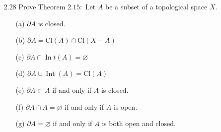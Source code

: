 \documentclass[12pt]{article}
\begin{document}
\begin{enumerate}
	\item[2.28] Prove Theorem $2.15 :$ Let $A$ be a subset of a topological space $X .$
		\begin{enumerate}
			\item[(a)] $\partial A$ is closed.
			\item[(b)] $\partial A = \mathrm { Cl } ( A ) \cap \mathrm { Cl } ( X - A )$
			\item[(c)] $\partial A \cap \operatorname { In } t ( A ) = \varnothing$
			\item[(d)] $\partial A \cup \operatorname { Int } ( A ) = \mathrm { Cl } ( A )$
			\item[(e)] $\partial A \subset A$ if and only if $A$ is closed.
			\item[(f)] $\partial A \cap A = \varnothing$ if and only if $A$ is open.
			\item[(g)] $\partial A = \varnothing$ if and only if $A$ is both open and closed.
		\end{enumerate}
\end{enumerate}
 
\end{document}
